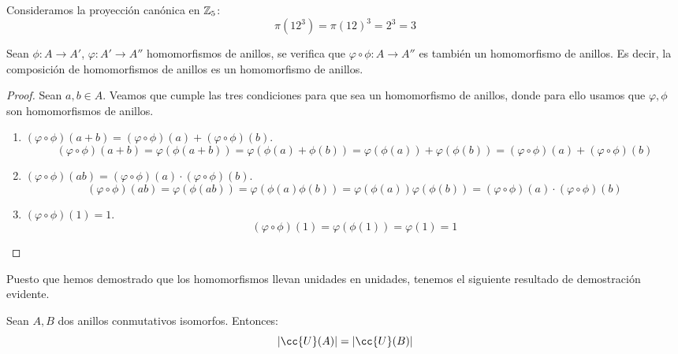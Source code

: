 \begin{ejemplo}
    Consideramos la proyección canónica en $\mathbb Z_5$:
    $$\pi(12^3) = \pi(12)^3 = 2^3 = 3$$
\end{ejemplo}

\begin{prop}
    Sean $\phi:A\longrightarrow A'$, $\varphi:A'\longrightarrow A''$ homomorfismos de anillos, se verifica que $\varphi \circ \phi:A\longrightarrow A''$ es también un homomorfismo de anillos. Es decir, la composición de homomorfismos de anillos es un homomorfismo de anillos.
\end{prop}
\begin{proof}
    Sean $a,b \in A$. Veamos que cumple las tres condiciones para que sea un homomorfismo de anillos, donde para ello usamos que $\varphi, \phi$ son homomorfismos de anillos.
    \begin{enumerate}
        \item $(\varphi \circ \phi)(a+b) = (\varphi \circ \phi)(a) + (\varphi \circ \phi)(b)$.
        \begin{equation*}
            (\varphi \circ \phi)(a+b) = \varphi(\phi(a+b)) = \varphi(\phi(a) + \phi(b)) = \varphi(\phi(a)) + \varphi(\phi(b)) = (\varphi \circ \phi)(a) + (\varphi \circ \phi)(b)
        \end{equation*}

        \item $(\varphi \circ \phi)(ab) = (\varphi \circ \phi)(a)\cdot (\varphi \circ \phi)(b)$.
        \begin{equation*}
            (\varphi \circ \phi)(ab) = \varphi(\phi(ab)) = \varphi(\phi(a)\phi(b)) = \varphi(\phi(a))\varphi(\phi(b)) = (\varphi \circ \phi)(a)\cdot (\varphi \circ \phi)(b)
        \end{equation*}

        \item $(\varphi \circ \phi)(1)=1$.
        \begin{equation*}
            (\varphi \circ \phi)(1) = \varphi(\phi(1)) = \varphi(1) = 1
        \end{equation*}
    \end{enumerate}
\end{proof}

Puesto que hemos demostrado que los homomorfismos llevan unidades en unidades, tenemos el siguiente resultado de demostración evidente.
\begin{prop}
    Sean $A,B$ dos anillos conmutativos isomorfos. Entonces:
    $$|\cc{U}(A)| = |\cc{U}(B)|$$
\end{prop}

